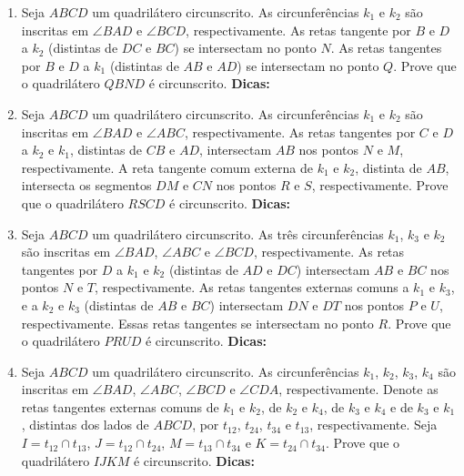 \documentclass{article}
\newcommand{\dica}{\textbf{Dicas:}}
\begin{document}
\begin{multicols}{2}
\begin{enumerate}
    \item Seja $ABCD$ um quadrilátero circunscrito. As circunferências $k_1$ e $k_2$ são inscritas em $\angle BAD$ e $\angle BCD$, respectivamente. As retas tangente por $B$ e $D$ a $k_2$ (distintas de $DC$ e $BC$) se intersectam no ponto $N$. As retas tangentes por $B$ e $D$ a $k_1$ (distintas de $AB$ e $AD$) se intersectam no ponto $Q$. Prove que o quadrilátero $QBND$ é circunscrito. \dica %
    
    \item Seja $ABCD$ um quadrilátero circunscrito. As circunferências $k_1$ e $k_2$ são inscritas em $\angle BAD$ e $\angle ABC$, respectivamente. As retas tangentes por $C$ e $D$ a $k_2$ e $k_1$, distintas de $CB$ e $AD$, intersectam $AB$ nos pontos $N$ e $M$, respectivamente. A reta tangente comum externa de $k_1$ e $k_2$, distinta de $AB$, intersecta os segmentos $DM$ e $CN$ nos pontos $R$ e $S$, respectivamente. Prove que o quadrilátero $RSCD$ é circunscrito. \dica %
    
    \item Seja $ABCD$ um quadrilátero circunscrito. As três circunferências $k_1$, $k_3$ e $k_2$ são inscritas em $\angle BAD$, $\angle ABC$ e $\angle BCD$, respectivamente. As retas tangentes por $D$ a $k_1$ e $k_2$ (distintas de $AD$ e $DC$) intersectam $AB$ e $BC$ nos pontos $N$ e $T$, respectivamente. As retas tangentes externas comuns a $k_1$ e $k_3$, e a $k_2$ e $k_3$ (distintas de $AB$ e $BC$) intersectam $DN$ e $DT$ nos pontos $P$ e $U$, respectivamente. Essas retas tangentes se intersectam no ponto $R$. Prove que o quadrilátero $PRUD$ é circunscrito. \dica %
    
    \item Seja $ABCD$ um quadrilátero circunscrito. As circunferências $k_1$, $k_2$, $k_3$, $k_4$ são inscritas em $\angle BAD$, $\angle ABC$, $\angle BCD$ e $\angle CDA$, respectivamente. Denote as retas tangentes externas comuns de $k_1$ e $k_2$, de $k_2$ e $k_4$, de $k_3$ e $k_4$ e de $k_3$ e $k_1$, distintas dos lados de $ABCD$, por $t_{12}$, $t_{24}$, $t_{34}$ e $t_{13}$, respectivamente. Seja $I=t_{12}\cap t_{13}$, $J=t_{12}\cap t_{24}$, $M=t_{13}\cap t_{34}$ e $K=t_{24}\cap t_{34}$. Prove que o quadrilátero $IJKM$ é circunscrito. \dica %
    
    
    
    
    
    
    
    
    
\end{enumerate}
\end{multicols}
\end{document}
